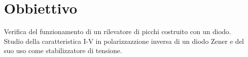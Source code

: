 \section*{Obbiettivo}

Verifica del funzionamento di un rilevatore di picchi costruito con un diodo. Studio della caratteristica I-V in polarizzazzione
inversa di un diodo Zener e del suo uso come stabilizzatore di tensione.
